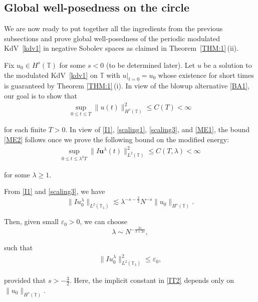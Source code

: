 \documentclass[letterpaper, 11pt,  reqno]{amsart}
\newcommand{\1}{\hspace{0.5mm}\text{I}\hspace{0.5mm}}
\newcommand{\noi}{\noindent}
\newcommand{\T}{\mathbb{T}}
\newcommand{\eps}{\varepsilon}
\newcommand{\ld}{\lambda}
\newcommand{\les}{\lesssim}
\newcommand{\uu}{\mathbf{u}}
\numberwithin{equation}{section}
\numberwithin{theorem}{section}
\begin{document}
\subsection{Global well-posedness on the circle}
\label{SUBSEC:I4}


We are now ready to put  together all the ingredients from the previous subsections
and prove
global well-posedness  
of the periodic modulated KdV~\eqref{kdv1} in negative Sobolev spaces
as  claimed in Theorem~\ref{THM:1}\,(ii).

Fix $u_0 \in H^s(\T)$ for some $s < 0$ (to be determined later).
Let 
 $u$ be a solution to  the modulated KdV~\eqref{kdv1} on $\T$ 
with $u|_{t = 0} = u_0$
whose existence for short times is guaranteed by Theorem \ref{THM:1}\,(i).
In view of the blowup alternative \eqref{BA1}, 
our goal is to show that 
\begin{align}
\sup_{0 \le t \le T} \|u(t)\|_{H^s(\T)}^2 \le C(T) < \infty
\label{ME2}
\end{align}


\noi
for  each finite $T > 0$.
In view of 
 \eqref{I1}, \eqref{scaling1}, \eqref{scaling3}, and \eqref{ME1}, 
the bound \eqref{ME2} follows once we prove the following bound on the modified energy:
\begin{align*}
\sup_{0 \le t \le \ld^3 T} \|I\uu^\ld(t)\|_{L^2(\T)}^2 \le C(T, \ld ) < \infty
\end{align*}

\noi
for some $\ld \ge 1$.



From \eqref{I1} and \eqref{scaling3}, we have 
\begin{equation}
 \| I  u_0^{\ld} \|_{L^2(\T_\ld) }
 \les \ld^{-s-\frac 32} N^{-s} \|  u_0  \|_{H^{s}(\T)}.
 \label{IT1}
\end{equation}


\noi
Then, given small $\eps_0 > 0$, 
we can choose 
\begin{equation}
\ld \sim N^{-\frac{2s}{3+2s}}, 
 \label{IT2}
\end{equation}


\noi
such that 
\begin{align}
\| Iu_0^{\ld} \|^2 _{L^2(\T_\ld)}\le \eps_0, 
\label{IT2a}
\end{align}


\noi
provided that $s > -\frac 32$.
Here, 
 the implicit constant in \eqref{IT2} depends only on ${\| u_0 \|_{H^{s}(\T) }} $.
\end{document}
